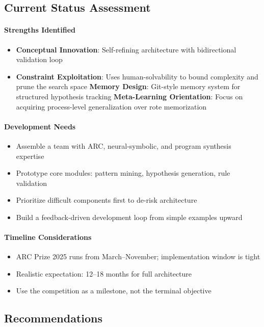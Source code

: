 \documentclass[12pt]{article}
\begin{document}
\subsection*{Current Status Assessment}

\paragraph{Strengths Identified}
\begin{itemize}
\item \textbf{Conceptual Innovation}: Self-refining architecture with bidirectional validation loop
\item \textbf{Constraint Exploitation}: Uses human-solvability to bound complexity and prune the search space
\textbf{Memory Design}: Git-style memory system for structured hypothesis tracking
\textbf{Meta-Learning Orientation}: Focus on acquiring process-level generalization over rote memorization
\end{itemize}

\paragraph{Development Needs}
\begin{itemize}
\item Assemble a team with ARC, neural-symbolic, and program synthesis expertise
\item Prototype core modules: pattern mining, hypothesis generation, rule validation
\item Prioritize difficult components first to de-risk architecture
\item Build a feedback-driven development loop from simple examples upward
\end{itemize}

\paragraph{Timeline Considerations}
\begin{itemize}
\item ARC Prize 2025 runs from March–November; implementation window is tight
\item Realistic expectation: 12–18 months for full architecture
\item Use the competition as a milestone, not the terminal objective
\end{itemize}

\subsection*{Recommendations}
\end{document}
